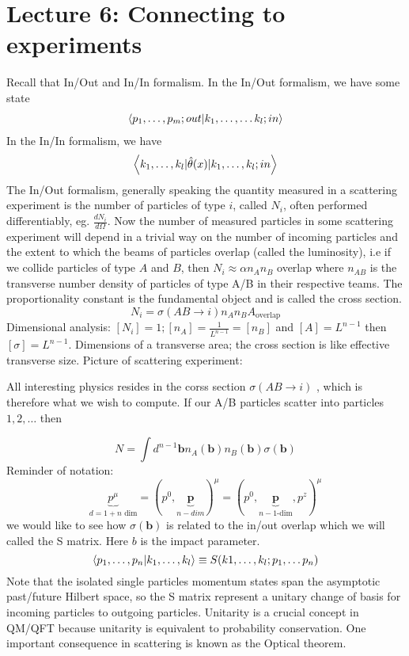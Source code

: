 \section{Lecture 6: Connecting to experiments }
Recall that In/Out and In/In formalism. In the In/Out formalism, we have some state
\begin{align}
    \expval{p_1, \dots, p_m; out| k_1, \dots, \dots k_{l}; in}
\end{align}
In the In/In formalism, we have 
\begin{equation}
    \expval{ k_1, \dots, k_l |\hat{\theta}(x)|k_1, \dots, k_l; in}
\end{equation}
The In/Out formalism, generally speaking the quantity measured in a scattering experiment is the number of particles of type $i$, called $N_i$, often performed differentiably, eg. $\frac{dN_i}{d\Omega}$. Now the number of measured particles in some scattering experiment will depend in a trivial way on the number of incoming particles and the extent to which the beams of particles overlap (called the luminosity), i.e if we collide particles of type $A$ and $B$, then $N_i \approx \alpha n_A n_B$ overlap where $n_{AB}$ is the transverse number density of particles of type A/B in their respective teams. The proportionality constant is the fundamental object and is called the cross section.
$$N_i = \sigma (AB \to i) n_A n_B A_{\text{overlap}}$$ Dimensional analysis: $[N_i] = 1; [n_A] = \frac{1}{L^{n-1}} = [n_B]$ and $[A] = L^{n-1}$ then $[\sigma] = L^{n-1}$. Dimensions of a transverse area; the cross section is like effective transverse size.  Picture of scattering experiment:

All interesting physics resides in the corss section $\sigma (AB \to i)$ , which is therefore what we wish to compute. If our A/B particles scatter into particles $1,2, \dots$ then

\begin{equation}
    N = \int d^{n-1} \bm{b} n_A (\bm{b}) n_B (\bm{b}) \sigma (\bm{b})
\end{equation}
Reminder of notation:
\begin{equation}
    \underbrace{p^\mu}_\text{$d = 1+n$ dim} = (p^0 , \underbrace{\bm{p}}_\text{$n-dim$})^\mu = (p^0, \underbrace{\bm{p}}_\text{$n-1$-dim} , p^z)^\mu
\end{equation}
we would like to see how $\sigma(\bm{b})$ is related to the in/out overlap which we will called the S matrix. Here $b$ is the impact parameter. 
$$\expval{p_1, \dots, p_n |k_1, \dots, k_l} \equiv S(k1, \dots, k_l ; p_1, \dots p_n)$$
Note that the isolated single particles momentum states span the asymptotic past/future Hilbert space, so the S matrix represent a unitary change of basis for incoming particles to outgoing particles. 
Unitarity is a crucial concept in QM/QFT because unitarity is equivalent to probability conservation. 
One important consequence in scattering is known as the Optical theorem. 

